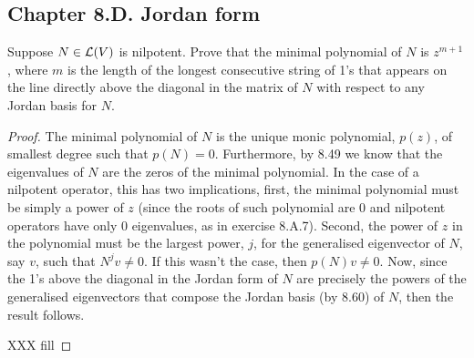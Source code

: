 \subsection*{Chapter 8.D. Jordan form}


\begin{exercise}{3}
  Suppose $N\in\mathcal{L}(V)$ is nilpotent. Prove that the minimal polynomial of $N$ is $z^{m+1}$, where $m$ is the length of the longest consecutive string of 1's that appears on the line directly above the diagonal in the matrix of $N$ with respect to any Jordan basis for $N$.
\end{exercise}
\begin{proof}
 The minimal polynomial of $N$ is the unique monic polynomial, $p(z)$, of smallest degree such that $p(N)=0$. Furthermore, by 8.49 we know that the eigenvalues of $N$ are the zeros of the minimal polynomial. In the case of a nilpotent operator, this has two implications, first, the minimal polynomial must be simply a power of $z$ (since the roots of such polynomial are 0 and nilpotent operators have only 0 eigenvalues, as in exercise 8.A.7). Second, the power of $z$ in the polynomial must be the largest power, $j$, for the generalised eigenvector of $N$, say $v$, such that $N^jv\neq 0$. If this wasn't the case, then $p(N)v\neq 0$. Now, since the 1's above the diagonal in the Jordan form of $N$ are precisely the powers of the generalised eigenvectors that compose the Jordan basis (by 8.60) of $N$, then the result follows. 

 XXX fill
\end{proof}

